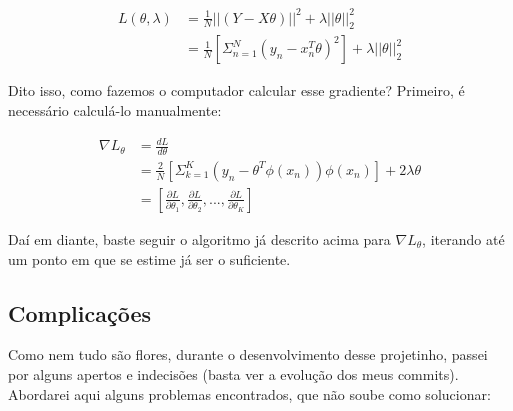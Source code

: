 \documentclass{article}
\begin{document}
\begin{align}
    L(\theta, \lambda) &= \frac{1}{N}
    ||(Y - X\theta)||^{2} + \lambda
    ||\theta||_{2}^{2} \\
    &= \frac{1}{N}[\Sigma_{n=1}^{N}
    (y_{n} - x_{n}^{T}\theta)^{2}] + \lambda
    ||\theta||_{2}^{2} 
\end{align}

Dito isso, como fazemos o computador calcular esse gradiente?
Primeiro, é necessário calculá-lo manualmente:

\begin{align}
    \nabla L_{\theta} &= \frac{dL}{d\theta} \\
    &= \frac{2}{N}[\Sigma_{k=1}^{K}
    (y_{n} - \theta^{T}\phi(x_{n}))\phi(x_{n})]
    + 2\lambda \theta \\
    &= [\frac{\partial L}{\partial \theta_{1}}, 
    \frac{\partial L}{\partial \theta_{2}}, ...,
    \frac{\partial L}{\partial \theta_{K}}]
\end{align}

Daí em diante, baste seguir o algoritmo já descrito acima
para $\nabla L_{\theta}$, iterando até 
um ponto em que se estime já ser o suficiente.

\subsection{Complicações}

Como nem tudo são flores, durante o desenvolvimento desse projetinho,
passei por alguns apertos e indecisões (basta ver a evolução dos
meus commits). Abordarei aqui alguns problemas encontrados, que não
soube como solucionar:
\end{document}
